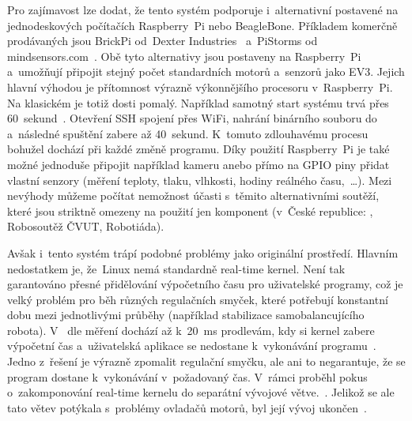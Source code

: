 Pro zajímavost lze dodat, že tento systém podporuje i~alternativní  postavené na jednodeskových počítačích Raspberry~Pi nebo BeagleBone. Příkladem komerčně prodávaných  jsou BrickPi od~Dexter Industries~\cite{lego_dexterindustries_brickpi} a~PiStorms od mindsensors.com~\cite{lego_mindsensor_pistorms}.
Obě tyto alternativy jsou postaveny na Raspberry~Pi a~umožňují připojit stejný počet standardních \lego{} motorů a~senzorů jako EV3.
Jejich hlavní výhodou je přítomnost výrazně výkonnějšího procesoru v~Raspberry~Pi. Na klasickém  je totiž \evThreeDev{} dosti pomalý. 
Například samotný start systému trvá přes 60~sekund~\cite{legoMindstormsEV3_ev3dev_video-system-boot}. 
Otevření SSH spojení přes WiFi, nahrání binárního souboru do  a~následné spuštění zabere až 40~sekund. 
K~tomuto zdlouhavému procesu bohužel dochází při každé změně programu. 
Díky použití Raspberry~Pi je také možné jednoduše připojit například kameru anebo přímo na GPIO piny přidat vlastní senzory (měření teploty, tlaku, vlhkosti, hodiny reálného času,~\dots).  
Mezi nevýhody můžeme počítat nemožnost účasti s~těmito alternativními  soutěží, které jsou striktně omezeny na použití jen \lego{} komponent (v~České republice: \fll{}, Robosoutěž ČVUT, Robotiáda).

Avšak i~tento systém trápí podobné problémy jako originální \lego{} prostředí. 
Hlavním nedostatkem je, že~Linux nemá standardně real-time kernel. 
Není tak garantováno přesné přidělování výpočetního času pro uživatelské programy, což je velký problém pro běh různých regulačních smyček, které potřebují konstantní dobu mezi jednotlivými průběhy (například stabilizace samobalancujícího robota). 
V~\evThreeDev{} dle měření dochází až k~20~ms prodlevám, kdy si kernel zabere výpočetní čas a~uživatelská aplikace se nedostane k~vykonávání programu~\cite{legoMindstormsEV3_ev3dev-issue_constant-loop-time}. 
Jedno z~řešení je výrazně zpomalit regulační smyčku, ale ani to negarantuje, že se program dostane k~vykonávání v~požadovaný čas.
V~rámci \evThreeDev{} proběhl pokus o~zakomponování real-time kernelu do separátní vývojové větve.~\cite{legoMindstormsEV3_ev3dev-rt-kernel-start}. 
Jelikož se ale tato větev potýkala s~problémy ovladačů motorů, byl její vývoj ukončen~\cite{legoMindstormsEV3_ev3dev-rt-kernel-end}.  


